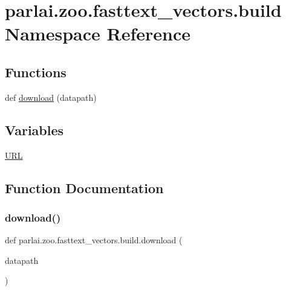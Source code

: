 \hypertarget{namespaceparlai_1_1zoo_1_1fasttext__vectors_1_1build}{}\section{parlai.\+zoo.\+fasttext\+\_\+vectors.\+build Namespace Reference}
\label{namespaceparlai_1_1zoo_1_1fasttext__vectors_1_1build}
\subsection*{Functions}
\begin{DoxyCompactItemize}
\item 
def \hyperlink{namespaceparlai_1_1zoo_1_1fasttext__vectors_1_1build_a7aab81733d26caeb7ab607173b53932b}{download} (datapath)
\end{DoxyCompactItemize}
\subsection*{Variables}
\begin{DoxyCompactItemize}
\item 
\hyperlink{namespaceparlai_1_1zoo_1_1fasttext__vectors_1_1build_a812e1e5e7e7dda31c2598cdf877c82ca}{U\+RL}
\end{DoxyCompactItemize}


\subsection{Function Documentation}
\mbox{\label{namespaceparlai_1_1zoo_1_1fasttext__vectors_1_1build_a7aab81733d26caeb7ab607173b53932b}} 
\subsubsection{\texorpdfstring{download()}{download()}}
{\footnotesize\ttfamily def parlai.\+zoo.\+fasttext\+\_\+vectors.\+build.\+download (\begin{DoxyParamCaption}\item[{}]{datapath }\end{DoxyParamCaption})}



